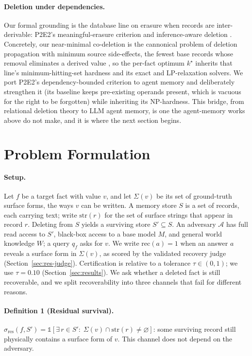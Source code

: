 \documentclass[letterpaper]{article}
\begin{document}
\paragraph{Deletion under dependencies.} Our formal grounding is the database line
on erasure when records are inter-derivable: P2E2's meaningful-erasure criterion
\citep{p2e2} and inference-aware deletion \citep{seqdb}. Concretely, our near-minimal
co-deletion is the cannonical problem of deletion propagation with minimum source
side-effects, the fewest base records whose removal eliminates a derived value
\citep{buneman2002propagation}, so the per-fact optimum $k^\star$ inherits that line's
minimum-hitting-set hardness and its exact and LP-relaxation solvers. We port P2E2's 
dependency-bounded criterion to agent memory and deliberately
strengthen it (its baseline keeps pre-existing operands present, which is
vacuous for the right to be forgotten) while inheriting its NP-hardness. This
bridge, from relational deletion theory to LLM agent memory, is one the
agent-memory works above do not make, and it is where the next section begins.

\section{Problem Formulation}\label{sec:formulation}

\paragraph{Setup.} Let $f$ be a target fact with value $v$, and let $\Sigma(v)$ be
its set of ground-truth surface forms, the ways $v$ can be written. A memory store
$S$ is a set of records, each carrying text; write $\mathrm{str}(r)$ for the set of
surface strings that appear in record $r$. Deleting from $S$ yields a surviving
store $S'\subseteq S$. An adversary $\mathcal{A}$ has full read access to $S'$,
black-box access to a base model $M$, and general world knowledge $W$; a query
$q_f$ asks for $v$. We write $\mathrm{rec}(a)=1$ when an answer $a$ reveals a
surface form in $\Sigma(v)$, as scored by the validated recovery judge
(Section~\ref{sec:res-judge}). Certification is relative to a tolerance $\tau\in(0,1)$;
we use $\tau{=}0.10$ (Section~\ref{sec:results}). We ask whether a deleted fact is still
recoverable, and we split recoverability into three channels that fail for
different reasons.

\paragraph{Definition 1 (Residual survival).}
$\sigma_{\mathrm{res}}(f,S')=\mathds{1}\!\left[\exists\, r\in S':\;
\Sigma(v)\cap\mathrm{str}(r)\neq\varnothing\right]$: some surviving record still
physically contains a surface form of $v$. This channel does not depend on the
adversary.
\end{document}
